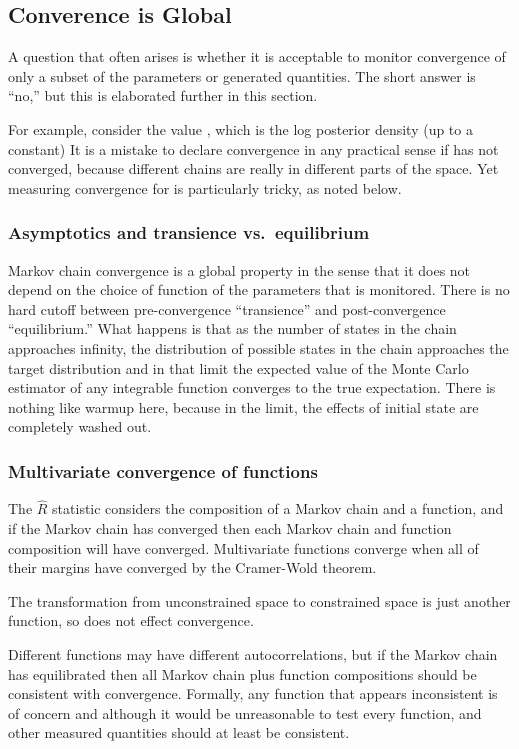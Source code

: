 \subsection{Converence is Global}

A question that often arises is whether it is acceptable to monitor
convergence of only a subset of the parameters or generated
quantities.  The short answer is ``no,'' but this is elaborated
further in this section.

For example, consider the value , which is the log
posterior density (up to a constant) It is a mistake to declare
convergence in any practical sense if  has not converged,
because different chains are really in different parts of the space.
Yet measuring convergence for  is particularly tricky, as
noted below.

\subsubsection{Asymptotics and transience vs.\ equilibrium}

Markov chain convergence is a global property in the sense that it
does not depend on the choice of function of the parameters that is
monitored.  There is no hard cutoff between pre-convergence
``transience'' and post-convergence ``equilibrium.''  What happens is
that as the number of states in the chain approaches infinity, the
distribution of possible states in the chain approaches the target
distribution and in that limit the expected value of the Monte Carlo
estimator of any integrable function converges to the true
expectation. There is nothing like warmup here, because in the limit,
the effects of initial state are completely washed out.

\subsubsection{Multivariate convergence of functions}

The $\hat{R}$ statistic considers the composition of a Markov chain
and a function, and if the Markov chain has converged then each Markov
chain and function composition will have converged. Multivariate
functions converge when all of their margins have converged by the
Cramer-Wold theorem.  

The transformation from unconstrained space to constrained space is
just another function, so does not effect convergence.

Different functions may have different autocorrelations, but if the
Markov chain has equilibrated then all Markov chain plus function
compositions should be consistent with convergence. Formally, any
function that appears inconsistent is of concern and although it would
be unreasonable to test every function,  and other
measured quantities should at least be consistent.

